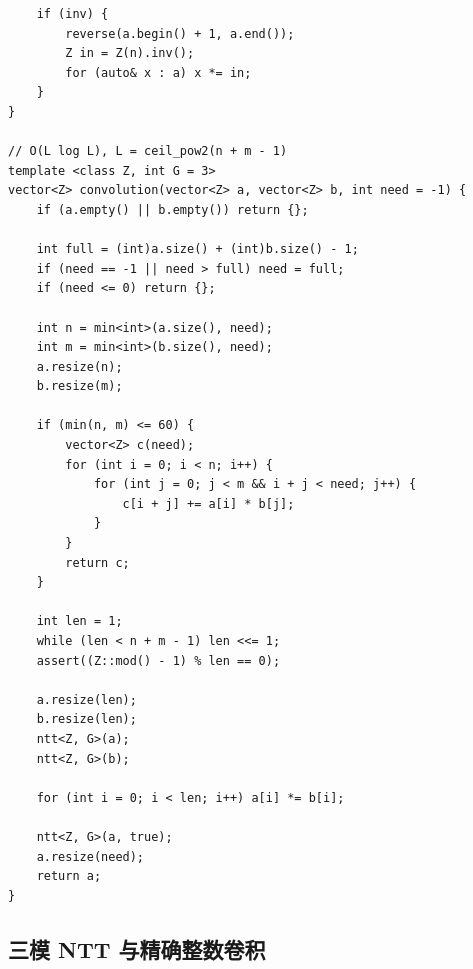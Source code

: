 \begin{lstlisting}
    if (inv) {
        reverse(a.begin() + 1, a.end());
        Z in = Z(n).inv();
        for (auto& x : a) x *= in;
    }
}

// O(L log L), L = ceil_pow2(n + m - 1)
template <class Z, int G = 3>
vector<Z> convolution(vector<Z> a, vector<Z> b, int need = -1) {
    if (a.empty() || b.empty()) return {};

    int full = (int)a.size() + (int)b.size() - 1;
    if (need == -1 || need > full) need = full;
    if (need <= 0) return {};

    int n = min<int>(a.size(), need);
    int m = min<int>(b.size(), need);
    a.resize(n);
    b.resize(m);

    if (min(n, m) <= 60) {
        vector<Z> c(need);
        for (int i = 0; i < n; i++) {
            for (int j = 0; j < m && i + j < need; j++) {
                c[i + j] += a[i] * b[j];
            }
        }
        return c;
    }

    int len = 1;
    while (len < n + m - 1) len <<= 1;
    assert((Z::mod() - 1) % len == 0);

    a.resize(len);
    b.resize(len);
    ntt<Z, G>(a);
    ntt<Z, G>(b);

    for (int i = 0; i < len; i++) a[i] *= b[i];

    ntt<Z, G>(a, true);
    a.resize(need);
    return a;
}
\end{lstlisting}

\subsection{三模 NTT 与精确整数卷积}
\par

